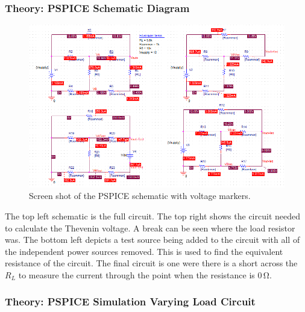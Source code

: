 \documentclass[11pt]{article}
\begin{document}
\subsubsection{Theory: PSPICE Schematic Diagram}

\begin{figure}[h!]
	\begin{center}
		\includegraphics[width=\textwidth]{schematic_1}
		\caption{Screen shot of the PSPICE schematic with voltage markers.}
		\label{Fig:SchematicVoltMarkers}
	\end{center}
\end{figure} 


The top left schematic is the full circuit. The top right shows the circuit needed to calculate the Thevenin voltage. A break can be seen where the load resistor was. The bottom left depicts a test source being added to the circuit with all of the independent power sources removed. This is used to find the equivalent resistance of the circuit. The final circuit is one were there is a short across the $R_L$ to measure the current through the point when the resistance is $0\,\si\ohm$.
\pagebreak
\subsubsection{Theory: PSPICE Simulation Varying Load Circuit}
\end{document}
